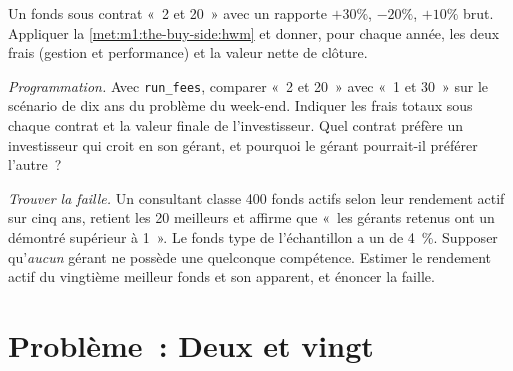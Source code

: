 \begin{exercise}[$\star\star$]\label{exo:m1:the-buy-side:6}
Un fonds sous contrat «~2 et 20~» avec un  rapporte
$+30\%$, $-20\%$, $+10\%$ brut. Appliquer la \cref{met:m1:the-buy-side:hwm} et
donner, pour chaque année, les deux frais (gestion et performance) et la valeur nette de clôture.
\end{exercise}

\begin{exercise}[$\star\star\star$]\label{exo:m1:the-buy-side:7}
\emph{Programmation.} Avec \texttt{run\_fees}, comparer «~2 et 20~» avec «~1 et
30~» sur le scénario de dix ans du problème du week-end. Indiquer les frais totaux sous chaque
contrat et la valeur finale de l'investisseur. Quel contrat préfère un investisseur qui
croit en son gérant, et pourquoi le gérant pourrait-il préférer l'autre~?
\end{exercise}

\begin{exercise}[$\star\star\star$]\label{exo:m1:the-buy-side:8}
\emph{Trouver la faille.} Un consultant classe 400 fonds actifs selon leur rendement
actif sur cinq ans, retient les 20 meilleurs et affirme que «~les gérants retenus
ont un  démontré supérieur à 1~». Le fonds type de
l'échantillon a un  de 4~\%. Supposer qu'\emph{aucun} gérant ne possède
une quelconque compétence. Estimer le rendement actif du vingtième meilleur fonds et son
 apparent, et énoncer la faille.
\end{exercise}

\section{Problème~: Deux et vingt}

